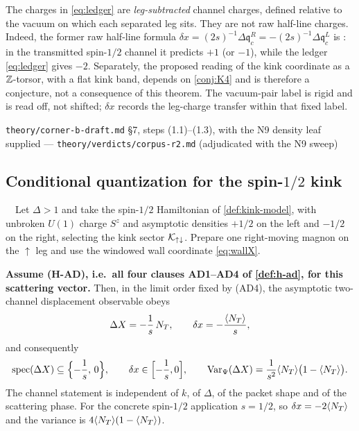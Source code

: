 \begin{scope}
\label{scope:B3}
The charges in \eqref{eq:ledger} are \emph{leg-subtracted} channel charges,
defined relative to the vacuum on which each separated leg sits. They are not
raw half-line charges. Indeed, the former raw half-line formula
$\delta x=(2s)^{-1}\Delta\mathfrak q^R_c=-(2s)^{-1}\Delta\mathfrak q^L_c$ is
\statusRefuted: in the transmitted spin-$1/2$ channel it predicts $+1$ (or
$-1$), while the ledger \eqref{eq:ledger} gives $-2$. Separately, the proposed
reading of the kink coordinate as a $\mathbb{Z}$-torsor, with a flat kink band, depends
on \cref{conj:K4} and is therefore a conjecture, not a consequence of this
theorem. The vacuum-pair label is rigid and is read off, not shifted; $\delta x$
records the leg-charge transfer within that fixed label.
\end{scope}

%
{\texttt{theory/corner-b-draft.md} \S7, steps (1.1)--(1.3), with the N9 density
 leaf supplied}%
{---}%
{\texttt{theory/verdicts/corpus-r2.md} (adjudicated with the N9 sweep)}

\subsection{Conditional quantization for the spin-\texorpdfstring{$1/2$}{1/2}
kink}

\begin{theorem}
\label{thm:M-quant}
\statusProvedConditional\ \ Let $\Delta>1$ and take the spin-$1/2$ Hamiltonian
of \cref{def:kink-model}, with unbroken $U(1)$ charge $S^z$ and asymptotic
densities $+1/2$ on the left and $-1/2$ on the right, selecting the kink sector
$\mathcal{K}_{\uparrow\downarrow}$. Prepare one right-moving magnon on the $\uparrow$
leg and use the windowed wall coordinate \eqref{eq:wallX}.

\textbf{Assume (H-AD), i.e.\ all four clauses AD1--AD4 of \cref{def:h-ad}, for
this scattering vector.} Then, in the limit order fixed by (AD4), the
asymptotic two-channel displacement observable obeys
\begin{equation}
  \Delta X=-\frac{1}{s}\,N_T,
  \qquad
  \delta x=-\frac{\langle N_T\rangle}{s},
  \label{eq:Mquant}
\end{equation}
and consequently
\begin{equation}
  \operatorname{spec}(\Delta X)\subseteq\Bigl\{-\frac1s,\,0\Bigr\},
  \qquad
  \delta x\in\Bigl[-\frac1s,0\Bigr],
  \qquad
  \operatorname{Var}_\Psi(\Delta X)
  =\frac{1}{s^2}\langle N_T\rangle\bigl(1-\langle N_T\rangle\bigr).
  \label{eq:Mquant-spec}
\end{equation}
The channel statement is independent of $k$, of $\Delta$, of the packet shape
and of the scattering phase. For the concrete spin-$1/2$ application $s=1/2$,
so $\delta x=-2\langle N_T\rangle$ and the variance is $4\langle N_T\rangle(1-\langle N_T\rangle)$.
\end{theorem}

